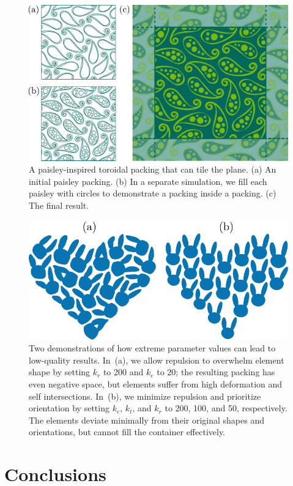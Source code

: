 \begin{figure}
\centering
\includegraphics[width=0.95\columnwidth]{figures/repulsionpak/paisley_new.pdf} 
\vspace{-10pt}
\caption[A paisley-inspired toroidal packing that can tile the plane]
{\label{paisley_packing}
A paisley-inspired toroidal packing that can tile the plane. 
           (a) An initial paisley packing.
           (b) In a separate simulation, we fill each paisley with circles to demonstrate a packing inside a packing.
           (c) The final result.
}
\end{figure}

\begin{figure}
\centering
\includegraphics[width=0.85\columnwidth]{figures/repulsionpak/bad_results.pdf} 
\vspace{-12pt}
\caption[Two demonstrations of how extreme parameter values can lead to \newline 
	low-quality results]
	{\label{bad_results}
Two demonstrations of how extreme parameter values can lead to
	low-quality results.  In~(a), we allow repulsion to overwhelm element
	shape by setting $k_r$ to 200 and $k_e$ to 20; the resulting packing 
	has even negative space, but elements suffer from high deformation
	and self intersections.  In~(b), we minimize repulsion and prioritize
	orientation by setting $k_e$, $k_t$, and $k_r$ to 200, 100, and 50,
	respectively.  The elements deviate minimally from their original shapes 
	and orientations, but cannot fill the container effectively.
}
\end{figure}


\section{Conclusions}
